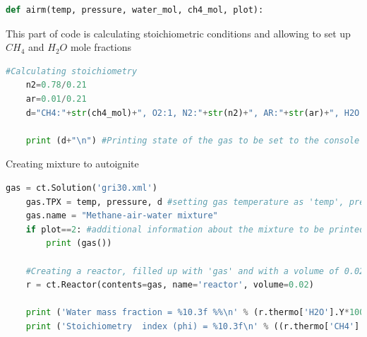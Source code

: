 \documentclass[a4paper]{article}
\begin{document}
	\begin{lstlisting}[language=python]
def airm(temp, pressure, water_mol, ch4_mol, plot):

\end{lstlisting}
    
This part of code is calculating stoichiometric conditions and allowing to set up $CH_4$ and $H_2O$ mole fractions

\begin{lstlisting}[language=python]
    #Calculating stoichiometry
    n2=0.78/0.21
    ar=0.01/0.21
    d="CH4:"+str(ch4_mol)+", O2:1, N2:"+str(n2)+", AR:"+str(ar)+", H2O:"+str(water_mol) 

    print (d+"\n") #Printing state of the gas to be set to the console
\end{lstlisting}
Creating mixture to autoignite
\begin{lstlisting}[language=python]
    gas = ct.Solution('gri30.xml')
    gas.TPX = temp, pressure, d #setting gas temperature as 'temp', pressure as 'pressure' and molar fractions as in 'd'
    gas.name = "Methane-air-water mixture"
    if plot==2: #additional information about the mixture to be printed if 'plot' was set to '2'
        print (gas())
    
    #Creating a reactor, filled up with 'gas' and with a volume of 0.02 cubic meters
    r = ct.Reactor(contents=gas, name='reactor', volume=0.02)
    
    print ('Water mass fraction = %10.3f %%\n' % (r.thermo['H2O'].Y*100))
    print ('Stoichiometry  index (phi) = %10.3f\n' % ((r.thermo['CH4'].X/r.thermo['O2'].X)/(0.5)) )
\end{lstlisting}
\end{document}
